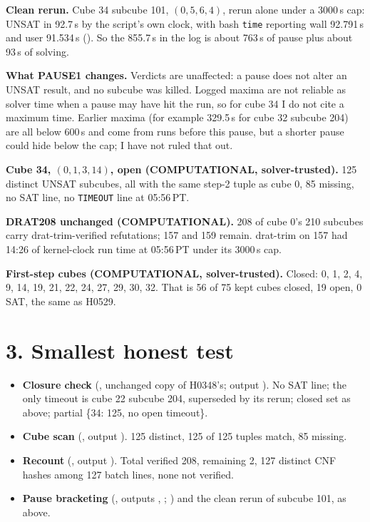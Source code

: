 \documentclass[11pt]{article}
\begin{document}
\textbf{Clean rerun.} Cube 34 subcube 101, $(0,5,6,4)$, rerun alone under a 3000\,s cap: UNSAT in 92.7\,s by the script's own clock, with bash \texttt{time} reporting wall 92.791\,s and user 91.534\,s (). So the 855.7\,s in the log is about 763\,s of pause plus about 93\,s of solving.

\textbf{What PAUSE1 changes.} Verdicts are unaffected: a pause does not alter an UNSAT result, and no subcube was killed. Logged maxima are not reliable as solver time when a pause may have hit the run, so for cube 34 I do not cite a maximum time. Earlier maxima (for example 329.5\,s for cube 32 subcube 204) are all below 600\,s and come from runs before this pause, but a shorter pause could hide below the cap; I have not ruled that out.

\textbf{Cube 34, $(0,1,3,14)$, open (COMPUTATIONAL, solver-trusted).} 125 distinct UNSAT subcubes, all with the same step-2 tuple as cube 0, 85 missing, no SAT line, no \texttt{TIMEOUT} line at 05:56\,PT.

\textbf{DRAT208 unchanged (COMPUTATIONAL).} 208 of cube 0's 210 subcubes carry drat-trim-verified refutations; 157 and 159 remain. drat-trim on 157 had 14:26 of kernel-clock run time at 05:56\,PT under its 3000\,s cap.

\textbf{First-step cubes (COMPUTATIONAL, solver-trusted).} Closed: 0, 1, 2, 4, 9, 14, 19, 21, 22, 24, 27, 29, 30, 32. That is 56 of 75 kept cubes closed, 19 open, 0 SAT, the same as H0529.

\section*{3. Smallest honest test}
\begin{itemize}
\item \textbf{Closure check} (, unchanged copy of H0348's; output ). No SAT line; the only timeout is cube 22 subcube 204, superseded by its rerun; closed set as above; partial \{34: 125, no open timeout\}.
\item \textbf{Cube scan} (, output ). 125 distinct, 125 of 125 tuples match, 85 missing.
\item \textbf{Recount} (, output ). Total verified 208, remaining 2, 127 distinct CNF hashes among 127 batch lines, none not verified.
\item \textbf{Pause bracketing} (, outputs , ; ) and the clean rerun of subcube 101, as above.
\end{itemize}
\end{document}
